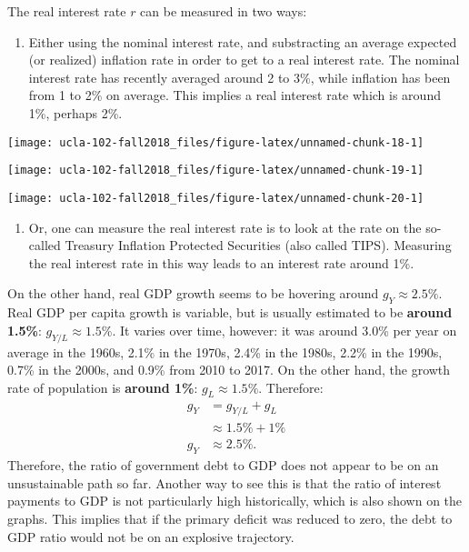 \documentclass[]{book}
\providecommand{\tightlist}{%
  \setlength{\itemsep}{0pt}\setlength{\parskip}{0pt}}
\theoremstyle{definition}
\theoremstyle{definition}
\theoremstyle{definition}
\theoremstyle{remark}
\begin{document}
The real interest rate \(r\) can be measured in two ways:

\begin{enumerate}
\def\labelenumi{\arabic{enumi}.}
\tightlist
\item
  Either using the nominal interest rate, and substracting an average
  expected (or realized) inflation rate in order to get to a real
  interest rate. The nominal interest rate has recently averaged around
  2 to 3\%, while inflation has been from 1 to 2\% on average. This
  implies a real interest rate which is around 1\%, perhaps 2\%.
\end{enumerate}

\begin{center}\texttt{[image: ucla-102-fall2018\_files/figure-latex/unnamed-chunk-18-1]} \end{center}

\begin{center}\texttt{[image: ucla-102-fall2018\_files/figure-latex/unnamed-chunk-19-1]} \end{center}

\begin{center}\texttt{[image: ucla-102-fall2018\_files/figure-latex/unnamed-chunk-20-1]} \end{center}

\begin{enumerate}
\def\labelenumi{\arabic{enumi}.}
\setcounter{enumi}{1}
\tightlist
\item
  Or, one can measure the real interest rate is to look at the rate on
  the so-called Treasury Inflation Protected Securities (also called
  TIPS). Measuring the real interest rate in this way leads to an
  interest rate around 1\%.
\end{enumerate}

On the other hand, real GDP growth seems to be hovering around
\(g_Y \approx 2.5\%\). Real GDP per capita growth is variable, but is
usually estimated to be \textbf{around 1.5\%}:
\(g_{Y/L} \approx 1.5\%\). It varies over time, however: it was around
3.0\% per year on average in the 1960s, 2.1\% in the 1970s, 2.4\% in the
1980s, 2.2\% in the 1990s, 0.7\% in the 2000s, and 0.9\% from 2010 to
2017. On the other hand, the growth rate of population is \textbf{around
1\%}: \(g_{L} \approx 1.5\%\). Therefore: \[
\begin{aligned}
g_Y &= g_{Y/L} + g_L\\
&\approx 1.5\% + 1\% \\
g_Y &\approx 2.5\%.
\end{aligned}
\] Therefore, the ratio of government debt to GDP does not appear to be
on an unsustainable path so far. Another way to see this is that the
ratio of interest payments to GDP is not particularly high historically,
which is also shown on the graphs. This implies that if the primary
deficit was reduced to zero, the debt to GDP ratio would not be on an
explosive trajectory.
\end{document}
